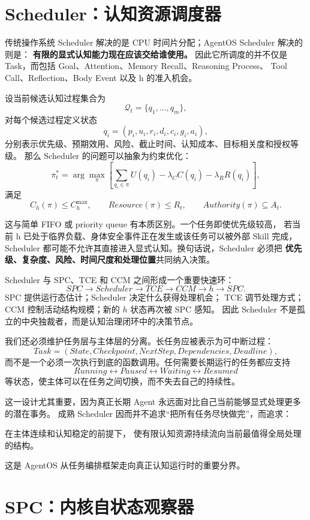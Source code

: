 \section{Scheduler：认知资源调度器}

传统操作系统 Scheduler 解决的是 CPU 时间片分配；AgentOS Scheduler 解决的则是：
\textbf{有限的显式认知能力现在应该交给谁使用。}
因此它所调度的并不仅是 Task，而包括 Goal、Attention、Memory Recall、Reasoning Process、
Tool Call、Reflection、Body Event 以及 h 的准入机会。

设当前候选认知过程集合为
\[
\mathcal Q_t=\{q_1,\ldots,q_m\},
\]
对每个候选过程定义状态
\[
q_i=
(
p_i,
u_i,
r_i,
d_i,
c_i,
g_i,
a_i
),
\]
分别表示优先级、预期效用、风险、截止时间、认知成本、目标相关度和授权等级。
那么 Scheduler 的问题可以抽象为约束优化：
\[
\pi_t^\ast
=
\arg\max_{\pi}
\left[
\sum_{q_i\in\pi}
U(q_i)
-
\lambda_C C(q_i)
-
\lambda_R R(q_i)
\right],
\]
满足
\[
C_h(\pi)\leq C_h^{\max},
\qquad
Resource(\pi)\leq R_t,
\qquad
Authority(\pi)\subseteq A_t.
\]

这与简单 FIFO 或 priority queue 有本质区别。一个任务即使优先级较高，
若当前 h 已处于临界负载、身体安全事件正在发生或该任务可以被外部 Skill 完成，
Scheduler 都可能不允许其直接进入显式认知。换句话说，Scheduler 必须把
\textbf{优先级、复杂度、风险、时间尺度和处理位置}共同纳入决策。

Scheduler 与 SPC、TCE 和 CCM 之间形成一个重要快速环：
\[
SPC
\rightarrow
Scheduler
\rightarrow
TCE
\rightarrow
CCM
\rightarrow
h
\rightarrow
SPC.
\]
SPC 提供运行态估计；Scheduler 决定什么获得处理机会；
TCE 调节处理方式；CCM 控制活动结构规模；新的 $h$ 状态再次被 SPC 感知。
因此 Scheduler 不是孤立的中央独裁者，而是认知治理闭环中的决策节点。

我们还必须维护任务层与主体层的分离。长任务应被表示为可中断过程：
\[
Task
=
(State,Checkpoint,NextStep,Dependencies,Deadline),
\]
而不是一个必须一次执行到底的函数调用。任何需要长期运行的任务都应支持
\[
Running
\leftrightarrow
Paused
\leftrightarrow
Waiting
\leftrightarrow
Resumed
\]
等状态，使主体可以在任务之间切换，而不失去自己的持续性。

这一设计尤其重要，因为真正长期 Agent 永远面对比自己当前能够显式处理更多的潜在事务。
成熟 Scheduler 因而并不追求``把所有任务尽快做完''，而追求：
\begin{statementbox}
在主体连续和认知稳定的前提下，
使有限认知资源持续流向当前最值得全局处理的结构。
\end{statementbox}
这是 AgentOS 从任务编排框架走向真正认知运行时的重要分界。


\section{SPC：内核自状态观察器}

